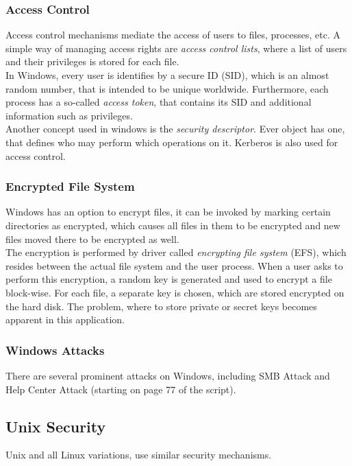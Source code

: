 \documentclass[a4paper, 10 pt, conference]{ieeeconf}
\begin{document}
\subsubsection{\textbf{Access Control}}
Access control mechanisms mediate the access of users to files, processes, etc. A simple way of managing access rights are \emph{access control lists}, where a list of users and their privileges is stored for each file. \\
In Windows, every user is identifies by a secure ID (SID), which is an almost random number, that is intended to be unique worldwide. Furthermore, each process has a so-called \emph{access token}, that contains its SID and additional information such as privileges. \\
Another concept used in windows is the \emph{security descriptor}. Ever object has one, that defines who may perform which operations on it. Kerberos is also used for access control. 

\vspace{0.5cm}
\subsubsection{\textbf{Encrypted File System}}
\label{efs}
Windows has an option to encrypt files, it can be invoked by marking certain directories as encrypted, which causes all files in them to be encrypted and new files moved there to be encrypted as well. \\
The encryption is performed by driver called \emph{encrypting file system} (EFS), which resides between the actual file system and the user process. When a user asks to perform this encryption, a random key is generated and used to encrypt a file block-wise. For each file, a separate key is chosen, which are stored encrypted on the hard disk. The problem, where to store private or secret keys becomes apparent in this application. 
\vspace{0.5cm}
\subsubsection{\textbf{Windows Attacks}}
There are several prominent attacks on Windows, including SMB Attack and Help Center Attack (starting on page 77 of the script).
\subsection{\textbf{Unix Security}}
Unix and all Linux variations, use similar security mechanisms.
\vspace{0.5cm}
\end{document}
